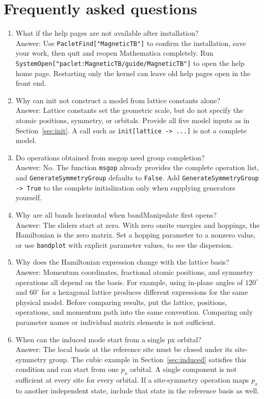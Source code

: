 \documentclass[titlepage,a4paper,12pt]{article}
\newcommand\litem[1]{\item{#1?\\}}
\begin{document}
\section{Frequently asked questions}
\begin{enumerate}[style=nextline]
\setlength\itemsep{1.2em}

\litem{What if the help pages are not available after installation}
Answer: Use \lstinline|PacletFind["MagneticTB"]| to confirm the installation,
save your work, then quit and reopen Mathematica completely. Run
\lstinline|SystemOpen["paclet:MagneticTB/guide/MagneticTB"]|
to open the help home page. Restarting only the kernel can leave old help
pages open in the front end.

\litem{Why can init not construct a model from lattice constants alone}
Answer: Lattice constants set the geometric scale, but do not specify the
atomic positions, symmetry, or orbitals.
Provide all five model inputs as in Section~\ref{sec:init}.
A call such as \lstinline|init[lattice -> ...]| is not a complete model.

\litem{Do operations obtained from msgop need group completion}
Answer: No. The function \lstinline|msgop| already provides the complete
operation list, and \lstinline|GenerateSymmetryGroup| defaults to
\lstinline|False|. Add \lstinline|GenerateSymmetryGroup -> True|
to the complete initialization only when supplying generators yourself.

\litem{Why are all bands horizontal when bandManipulate first opens}
Answer: The sliders start at zero. With zero onsite energies and hoppings,
the Hamiltonian is the zero matrix. Set a hopping parameter to a nonzero
value, or use \lstinline|bandplot| with explicit parameter values, to see
the dispersion.

\litem{Why does the Hamiltonian expression change with the lattice basis}
Answer: Momentum coordinates, fractional atomic positions, and symmetry
operations all depend on the basis. For example, using in-plane angles of
$120^\circ$ and $60^\circ$ for a hexagonal lattice produces different
expressions for the same physical model. Before comparing results, put the
lattice, positions, operations, and momentum path into the same convention.
Comparing only parameter names or individual matrix elements is not sufficient.

\litem{When can the induced mode start from a single px orbital}
Answer: The local basis at the reference site must be closed under its
site-symmetry group. The cubic example in Section~\ref{sec:induced} satisfies
this condition and can start from one $p_x$ orbital.
A single component is not sufficient at every site for every orbital.
If a site-symmetry operation maps $p_x$ to another independent state, include
that state in the reference basis as well.


\end{enumerate}
\end{document}
